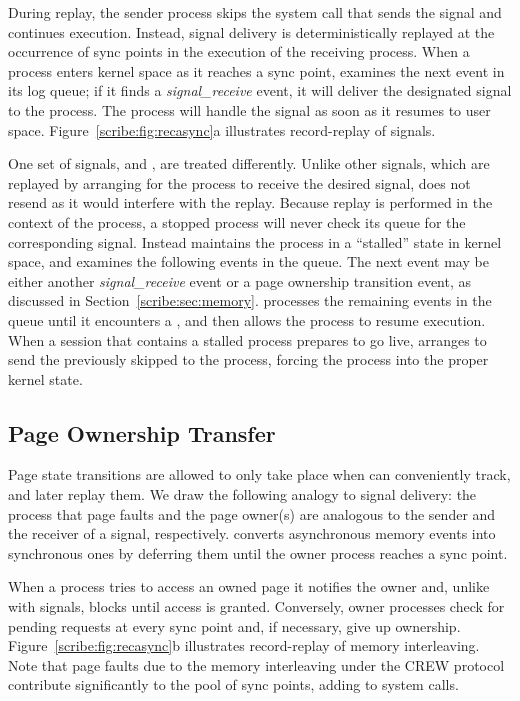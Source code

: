 \begin{table}[]
During replay, the sender process skips the system call that
sends the signal and continues execution. Instead, signal
delivery is deterministically replayed at the occurrence of sync
points in the execution of the receiving process. When
a process enters kernel space as it reaches a sync point, \scribe{}
examines the next event in its log queue; if it finds a
{\em signal\_receive} event, it will
deliver the designated signal to the process. The process will
handle the signal as soon as it resumes to user space.
Figure~\ref{scribe:fig:recasync}a illustrates record-replay of signals.

One set of signals,  and , are treated
differently.  Unlike other signals, which are replayed by arranging
for the process to receive the desired signal, \scribe{} does not
resend  as it would interfere with the replay. Because
replay is performed in the context of the process, a stopped process
will never check its queue for the corresponding
 signal. Instead \scribe{} maintains the process in a
``stalled'' state in kernel space, and examines the following events in
the queue. The next event may be either another {\em signal\_receive}
event or a page ownership transition event, as discussed in
Section~\ref{scribe:sec:memory}. \scribe{} 
processes the remaining events in the queue
until it encounters a , and then allows the process to
resume execution.  When a session that contains a stalled process
prepares to go live, \scribe{} arranges to send the previously
skipped  to the process, forcing the process into the
proper kernel state.

  

\subsection{Page Ownership Transfer}

Page state transitions are allowed to only take place when \scribe{}
can conveniently track, and later replay them. We draw the following
analogy to signal delivery: the process that page faults and the page
owner(s) are analogous to the sender and the receiver of a signal,
respectively.  \scribe{} converts asynchronous memory events into
synchronous ones by deferring them until the owner process reaches a
sync point.

When a process tries to access an owned page it notifies the owner
and, unlike with signals, blocks until access is granted.  Conversely,
owner processes check for pending requests at every sync point and, if
necessary, give up ownership. Figure~\ref{scribe:fig:recasync}b illustrates
record-replay of memory interleaving.  Note that page faults due to
the memory interleaving under the CREW protocol contribute
significantly to the pool of sync points, adding to system calls.


\end{table}
